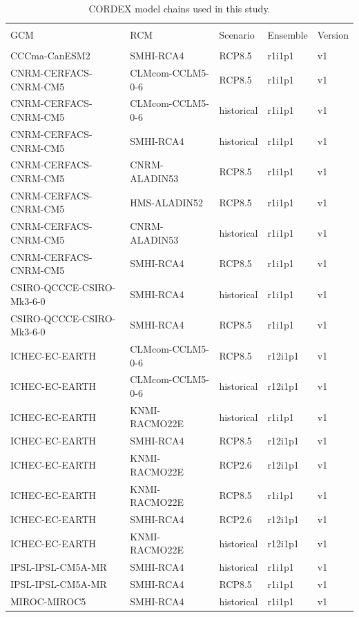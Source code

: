 \documentclass[hess, manuscript]{copernicus}
\begin{document}

\begin{table}[!htbp] \centering 
  \caption{CORDEX model chains used in this study.} 
  \label{} 
\begin{tabular}{@{\extracolsep{5pt}} lllll} 
\\[-1.8ex]\hline 
\hline \\[-1.8ex] 
GCM&RCM&Scenario&Ensemble&Version \\ 
\hline \\[-1.8ex] 

 CCCma-CanESM2&SMHI-RCA4&RCP8.5&r1i1p1&v1 \\ 
 CNRM-CERFACS-CNRM-CM5&CLMcom-CCLM5-0-6&RCP8.5&r1i1p1&v1 \\ 
 CNRM-CERFACS-CNRM-CM5&CLMcom-CCLM5-0-6&historical&r1i1p1&v1 \\ 
 CNRM-CERFACS-CNRM-CM5&SMHI-RCA4&historical&r1i1p1&v1 \\ 
 CNRM-CERFACS-CNRM-CM5&CNRM-ALADIN53&RCP8.5&r1i1p1&v1 \\ 
 CNRM-CERFACS-CNRM-CM5&HMS-ALADIN52&RCP8.5&r1i1p1&v1 \\ 
 CNRM-CERFACS-CNRM-CM5&CNRM-ALADIN53&historical&r1i1p1&v1 \\ 
 CNRM-CERFACS-CNRM-CM5&SMHI-RCA4&RCP8.5&r1i1p1&v1 \\ 
 CSIRO-QCCCE-CSIRO-Mk3-6-0&SMHI-RCA4&historical&r1i1p1&v1 \\ 
 CSIRO-QCCCE-CSIRO-Mk3-6-0&SMHI-RCA4&RCP8.5&r1i1p1&v1 \\ 
 ICHEC-EC-EARTH&CLMcom-CCLM5-0-6&RCP8.5&r12i1p1&v1 \\ 
 ICHEC-EC-EARTH&CLMcom-CCLM5-0-6&historical&r12i1p1&v1 \\ 
 ICHEC-EC-EARTH&KNMI-RACMO22E&historical&r1i1p1&v1 \\ 
 ICHEC-EC-EARTH&SMHI-RCA4&RCP8.5&r12i1p1&v1 \\ 
 ICHEC-EC-EARTH&KNMI-RACMO22E&RCP2.6&r12i1p1&v1 \\ 
 ICHEC-EC-EARTH&KNMI-RACMO22E&RCP8.5&r1i1p1&v1 \\ 
 ICHEC-EC-EARTH&SMHI-RCA4&RCP2.6&r12i1p1&v1 \\ 
 ICHEC-EC-EARTH&KNMI-RACMO22E&historical&r12i1p1&v1 \\ 
 IPSL-IPSL-CM5A-MR&SMHI-RCA4&historical&r1i1p1&v1 \\ 
 IPSL-IPSL-CM5A-MR&SMHI-RCA4&RCP8.5&r1i1p1&v1 \\ 
 MIROC-MIROC5&SMHI-RCA4&historical&r1i1p1&v1 \\ 

\end{tabular}
\end{table}
\end{document}

